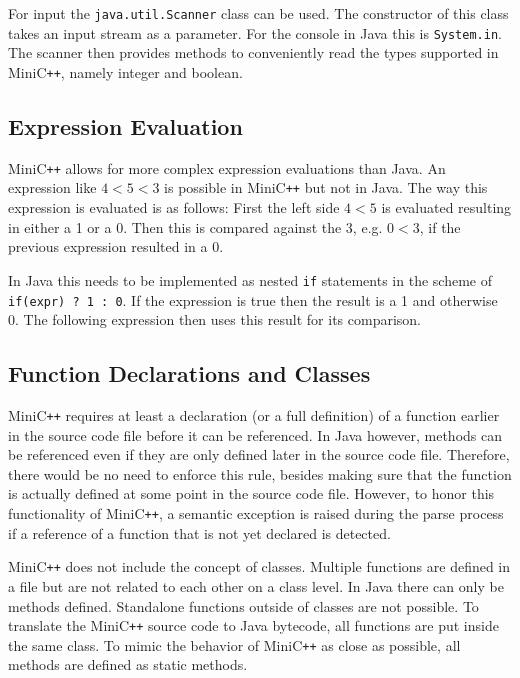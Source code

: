 For input the \verb|java.util.Scanner| class can be used. The constructor of this class takes an input stream as a parameter. For the console in Java this is \verb|System.in|. The scanner then provides methods to conveniently read the types supported in MiniC\verb|++|, namely integer and boolean.

\subsection{Expression Evaluation}

MiniC\verb|++| allows for more complex expression evaluations than Java. An expression like $4 < 5 < 3$ is possible in MiniC\verb|++| but not in Java. The way this expression is evaluated is as follows: First the left side $4 < 5$ is evaluated resulting in either a 1 or a 0. Then this is compared against the 3, e.g. $0 < 3$, if the previous expression resulted in a 0. 

In Java this needs to be implemented as nested \verb|if| statements in the scheme of \verb|if(expr) ? 1 : 0|. If the expression is true then the result is a 1 and otherwise 0. The following expression then uses this result for its comparison.

\subsection{Function Declarations and Classes}

MiniC\verb|++| requires at least a declaration (or a full definition) of a function earlier in the source code file before it can be referenced. In Java however, methods can be referenced even if they are only defined later in the source code file. Therefore, there would be no need to enforce this rule, besides making sure that the function is actually defined at some point in the source code file. However, to honor this functionality of MiniC\verb|++|, a semantic exception is raised during the parse process if a reference of a function that is not yet declared is detected. 

MiniC\verb|++| does not include the concept of classes. Multiple functions are defined in a file but are not related to each other on a class level. In Java there can only be methods defined. Standalone functions outside of classes are not possible. To translate the MiniC\verb|++| source code to Java bytecode, all functions are put inside the same class. To mimic the behavior of MiniC\verb|++| as close as possible, all methods are defined as static methods.  

